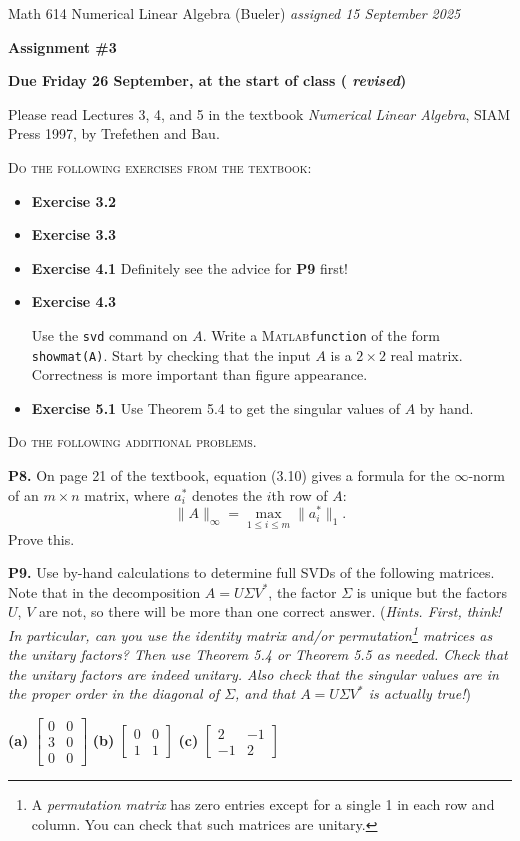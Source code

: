 \documentclass[12pt,dvipsnames]{amsart}
\newcommand{\prob}[1]{\bigskip\noindent\textbf{#1.}\quad }
\newcommand{\Matlab}{\textsc{Matlab}\xspace}
\newcommand{\ds}{\displaystyle}
\begin{document}
\scriptsize \noindent Math 614 Numerical Linear Algebra (Bueler) \hfill \emph{assigned 15 September 2025}
\normalsize\medskip

\Large\centerline{\textbf{Assignment \#3}}
\large
\medskip

\centerline{\textbf{Due {\color{BrickRed} Friday 26 September}, at the start of class ({\color{BrickRed} \emph{revised}})}}
\medskip
\normalsize

\thispagestyle{empty}

\bigskip

\noindent Please read Lectures 3, 4, and 5 in the textbook \emph{Numerical Linear Algebra}, SIAM Press 1997, by Trefethen and Bau.

\bigskip
\noindent \textsc{Do the following exercises from the textbook}:

\begin{itemize}[itemsep=4pt]
\item \textbf{Exercise 3.2}
\item \textbf{Exercise 3.3}
\item \textbf{Exercise 4.1} \qquad Definitely see the advice for \textbf{P9} first!
\item \textbf{Exercise 4.3} \qquad \begin{minipage}[t]{0.7\textwidth}
Use the \texttt{svd} command on $A$.  Write a \Matlab \texttt{function} of the form \texttt{showmat(A)}.  Start by checking that the input $A$ is a $2\times 2$ real matrix.  Correctness is more important than figure appearance.\end{minipage}
\item \textbf{Exercise 5.1} \qquad Use Theorem 5.4 to get the singular values of $A$ by hand.
\end{itemize}


\medskip
\noindent \textsc{Do the following additional problems.}

\prob{P8}  On page 21 of the textbook, equation (3.10) gives a formula for the $\infty$-norm of an $m\times n$ matrix, where $a_i^*$ denotes the $i$th row of $A$:
    $$\|A\|_\infty = \max_{1\le i \le m} \|a_i^*\|_1.$$
Prove this.

\prob{P9}  Use by-hand calculations to determine full SVDs of the following matrices.  Note that in the decomposition $A = U \Sigma V^*$, the factor $\Sigma$ is unique but the factors $U$, $V$ are not, so there will be more than one correct answer.  (\emph{Hints.  First, think!  In particular, can you use the identity matrix and/or permutation\footnote{A \emph{permutation matrix} has zero entries except for a single 1 in each row and column.  You can check that such matrices are unitary.} matrices as the unitary factors?  Then use Theorem 5.4 or Theorem 5.5 as needed.  Check that the unitary factors are indeed unitary.  Also check that the singular values are in the proper order in the diagonal of $\Sigma$, and that $A = U \Sigma V^*$ is actually true!})

\bigskip
\textbf{(a)} \quad $\ds \begin{bmatrix} 0 & 0 \\ 3 & 0 \\ 0 & 0 \end{bmatrix}$ \qquad
\textbf{(b)} \quad $\ds \begin{bmatrix} 0 & 0 \\ 1 & 1 \end{bmatrix}$ \qquad
\textbf{(c)} \quad $\ds \begin{bmatrix} 2 & -1 \\ -1 & 2 \end{bmatrix}$
\end{document}
